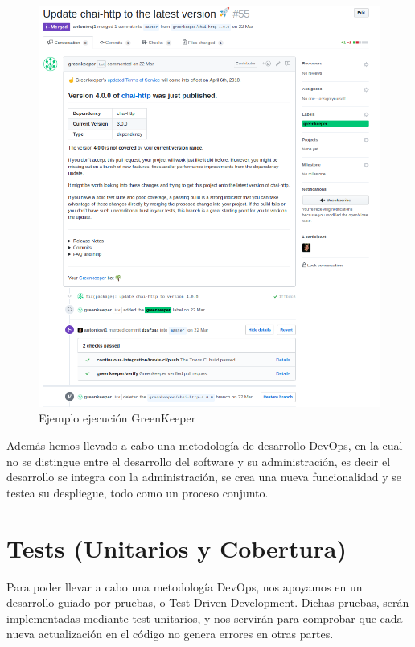 \begin{figure}
  \begin{center}
    \includegraphics[width=\textwidth]{imagenes/greenkeeper.png}
    \caption{Ejemplo ejecución GreenKeeper}
    \label{fig:greenkeeper}
  \end{center}
\end{figure}

Además hemos llevado a cabo una metodología de desarrollo DevOps, en la cual no se distingue entre el desarrollo del software y su administración, es decir el desarrollo se integra con la administración, se crea una nueva funcionalidad y se testea su despliegue, todo como un proceso conjunto.

\section {Tests (Unitarios y Cobertura)}
Para poder llevar a cabo una metodología DevOps, nos apoyamos en un desarrollo guiado por pruebas, o Test-Driven Development. Dichas pruebas, serán implementadas mediante test unitarios, y nos servirán para comprobar que cada nueva actualización en el código no genera errores en otras partes.

